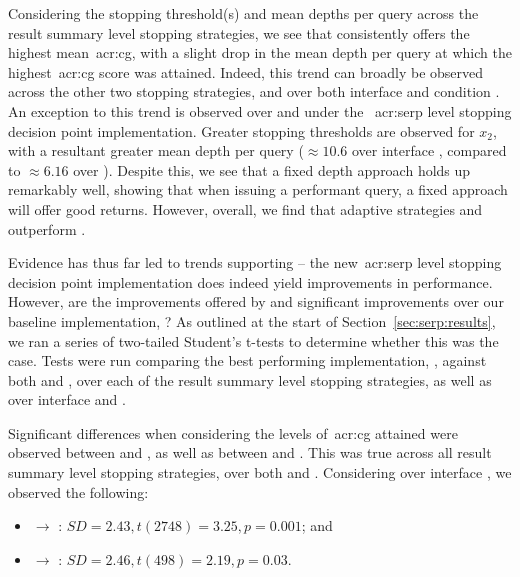 Considering the stopping threshold(s) and mean depths per query across the result summary level stopping strategies, we see that  consistently offers the highest mean~\gls{acr:cg}, with a slight drop in the mean depth per query at which the highest~\gls{acr:cg} score was attained. Indeed, this trend can broadly be observed across the other two stopping strategies, and over both interface  and condition . An exception to this trend is observed over  and  under the ~\gls{acr:serp} level stopping decision point implementation. Greater stopping thresholds are observed for $x_2$, with a resultant greater mean depth per query ($\approx10.6$ over interface , compared to $\approx6.16$ over ). Despite this, we see that a fixed depth approach holds up remarkably well, showing that when issuing a performant query, a fixed approach will offer good returns. However, overall, we find that adaptive strategies  and  outperform .

Evidence has thus far led to trends supporting  -- the new~\gls{acr:serp} level stopping decision point implementation does indeed yield improvements in performance. However, are the improvements offered by  and  significant improvements over our baseline implementation, ? As outlined at the start of Section~\ref{sec:serp:results}, we ran a series of two-tailed Student's t-tests to determine whether this was the case. Tests were run comparing the best performing implementation, , against both  and , over each of the result summary level stopping strategies, as well as over interface  and .

Significant differences when considering the levels of~\gls{acr:cg} attained were observed between  and , as well as between  and . This was true across all result summary level stopping strategies, over both  and . Considering  over interface , we observed the following:

\begin{itemize}
    \item{ $\rightarrow$ : $SD=2.43, t(2748)=3.25, p=0.001$; and}
    \item{ $\rightarrow$ : $SD=2.46, t(498)=2.19, p=0.03$.}
\end{itemize}


